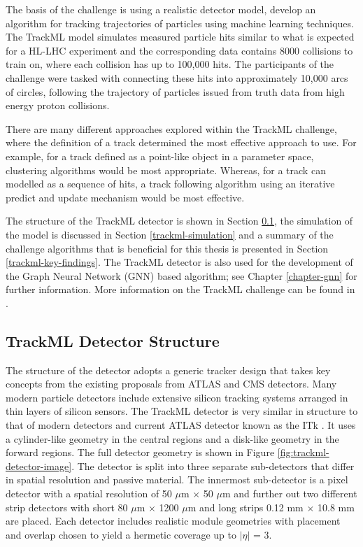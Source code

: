 The basis of the challenge is using a realistic detector model, develop an algorithm for tracking trajectories of particles using machine learning techniques. The TrackML model simulates measured particle hits similar to what is expected for a HL-LHC experiment and the corresponding data contains 8000 collisions to train on, where each collision has up to 100,000 hits. The participants of the challenge were tasked with connecting these hits into approximately 10,000 arcs of circles, following the trajectory of particles issued from truth data from high energy proton collisions. 

There are many different approaches explored within the TrackML challenge, where the definition of a track determined the most effective approach to use. For example, for a track defined as a point-like object in a parameter space, clustering algorithms would be most appropriate. Whereas, for a track can modelled as a sequence of hits, a track following algorithm using an iterative predict and update mechanism would be most effective.

The structure of the TrackML detector is shown in Section \ref{trackml-structure}, the simulation of the model is discussed in Section \ref{trackml-simulation} and a summary of the challenge algorithms that is beneficial for this thesis is presented in Section \ref{trackml-key-findings}. The TrackML detector is also used for the development of the Graph Neural Network (GNN) based algorithm; see Chapter \ref{chapter-gnn} for further information. More information on the TrackML challenge can be found in \cite{Amrouche_2019}.

\subsection{TrackML Detector Structure}
\label{trackml-structure}
The structure of the detector adopts a generic tracker design that takes key concepts from the existing proposals from ATLAS and CMS detectors. Many modern particle detectors include extensive silicon tracking systems arranged in thin layers of silicon sensors. The TrackML detector is very similar in structure to that of modern detectors and current ATLAS detector known as the ITk \cite{inner-detector-TDR}. It uses a cylinder-like geometry in the central regions and a disk-like geometry in the forward regions. The full detector geometry is shown in Figure \ref{fig:trackml-detector-image}. The detector is split into three separate sub-detectors that differ in spatial resolution and passive material. The innermost sub-detector is a pixel detector with a spatial resolution of 50 $\mu$m $\times$ 50 $\mu$m and further out two different strip detectors with short 80 $\mu$m × 1200 $\mu$m and long strips 0.12 mm $\times$ 10.8 mm are placed. Each detector includes realistic module geometries with placement and overlap chosen to yield a hermetic coverage up to $\lvert \eta \rvert$ = 3.

